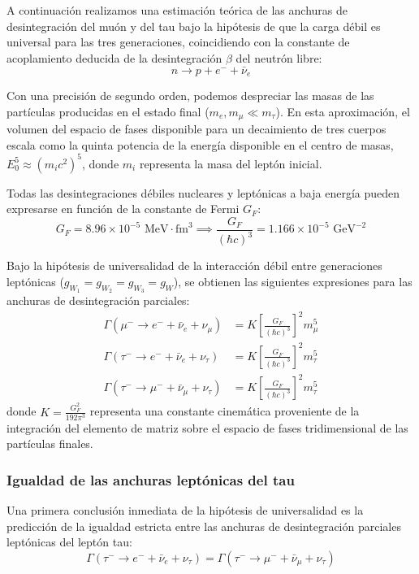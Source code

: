 A continuación realizamos una estimación teórica de las anchuras de desintegración del muón y del tau bajo la hipótesis de que la carga débil es universal para las tres generaciones, coincidiendo con la constante de acoplamiento deducida de la desintegración $\beta$ del neutrón libre:
\begin{equation}
    n \to p + e^- + \bar{\nu}_e
\end{equation}

Con una precisión de segundo orden, podemos despreciar las masas de las partículas producidas en el estado final ($m_e, m_\mu \ll m_\tau$). En esta aproximación, el volumen del espacio de fases disponible para un decaimiento de tres cuerpos escala como la quinta potencia de la energía disponible en el centro de masas, $E_0^5 \approx (m_i c^2)^5$, donde $m_i$ representa la masa del leptón inicial.

Todas las desintegraciones débiles nucleares y leptónicas a baja energía pueden expresarse en función de la constante de Fermi $G_F$:
\begin{equation}
    G_F = 8.96 \times 10^{-5}\text{ MeV}\cdot\text{fm}^3 \implies \frac{G_F}{(\hbar c)^3} = 1.166 \times 10^{-5}\text{ GeV}^{-2}
\end{equation}

Bajo la hipótesis de universalidad de la interacción débil entre generaciones leptónicas ($g_{W_1} = g_{W_2} = g_{W_3} = g_W$), se obtienen las siguientes expresiones para las anchuras de desintegración parciales:
\begin{align}
    \Gamma(\mu^- \to e^- + \bar{\nu}_e + \nu_\mu) &= K \left[ \frac{G_F}{(\hbar c)^3} \right]^2 m_\mu^5 \\
    \Gamma(\tau^- \to e^- + \bar{\nu}_e + \nu_\tau) &= K \left[ \frac{G_F}{(\hbar c)^3} \right]^2 m_\tau^5 \\
    \Gamma(\tau^- \to \mu^- + \bar{\nu}_\mu + \nu_\tau) &= K \left[ \frac{G_F}{(\hbar c)^3} \right]^2 m_\tau^5
\end{align}
donde $K = \frac{G_F^2}{192\pi^3}$ representa una constante cinemática proveniente de la integración del elemento de matriz sobre el espacio de fases tridimensional de las partículas finales.

\subsubsection*{Igualdad de las anchuras leptónicas del tau}

Una primera conclusión inmediata de la hipótesis de universalidad es la predicción de la igualdad estricta entre las anchuras de desintegración parciales leptónicas del leptón tau:
\begin{equation}
    \Gamma(\tau^- \to e^- + \bar{\nu}_e + \nu_\tau) = \Gamma(\tau^- \to \mu^- + \bar{\nu}_\mu + \nu_\tau)
\end{equation}


